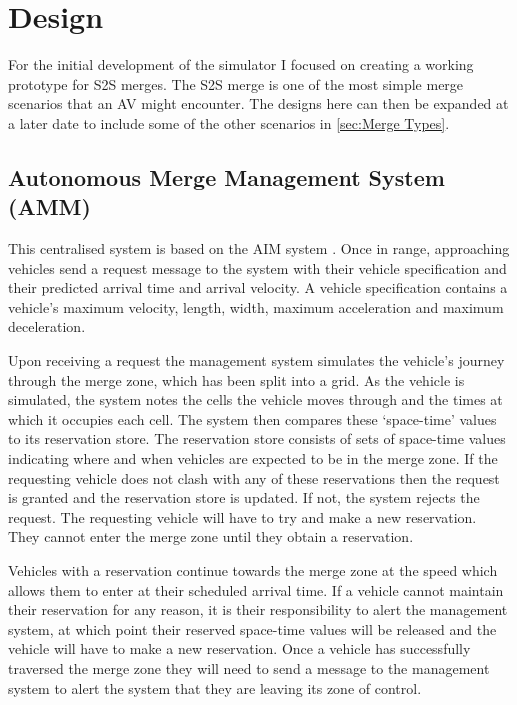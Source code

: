 \chapter{Design}
\label{cha:Design}
For the initial development of the simulator I focused on creating a working prototype for S2S merges. The S2S merge is one of the most simple merge scenarios that an AV might encounter. The designs here can then be expanded at a later date to include some of the other scenarios in \ref{sec:Merge Types}.

\section{Autonomous Merge Management System (AMM)}
\label{sec:Autonomous Merge Management System}
This centralised system is based on the AIM system \citep{Dresner2004}. Once in range, approaching vehicles send a request message to the system with their vehicle specification and their predicted arrival time and arrival velocity. A vehicle specification contains a vehicle's maximum velocity, length, width, maximum acceleration and maximum deceleration.

Upon receiving a request the management system simulates the vehicle's journey through the merge zone, which has been split into a grid. As the vehicle is simulated, the system notes the cells the vehicle moves through and the times at which it occupies each cell. The system then compares these `space-time' values to its reservation store. The reservation store consists of sets of space-time values indicating where and when vehicles are expected to be in the merge zone. If the requesting vehicle does not clash with any of these reservations then the request is granted and the reservation store is updated. If not, the system rejects the request. The requesting vehicle will have to try and make a new reservation. They cannot enter the merge zone until they obtain a reservation.

Vehicles with a reservation continue towards the merge zone at the speed which allows them to enter at their scheduled arrival time. If a vehicle cannot maintain their reservation for any reason, it is their responsibility to alert the management system, at which point their reserved space-time values will be released and the vehicle will have to make a new reservation. Once a vehicle has successfully traversed the merge zone they will need to send a message to the management system to alert the system that they are leaving its zone of control. 

